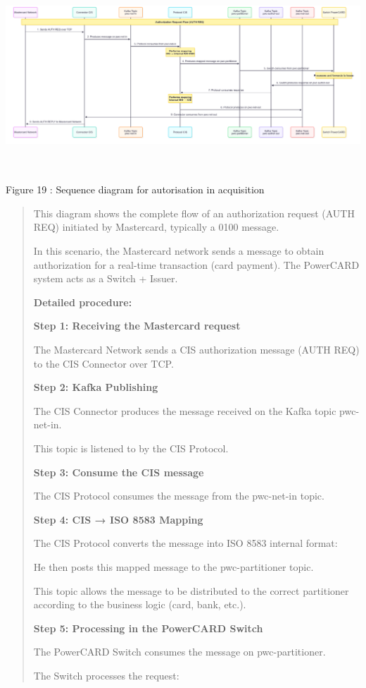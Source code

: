\documentclass[12pt,a4paper]{report}
\begin{document}
\includegraphics[width=7.21985in,height=2.8089in]{vertopal_d1b0b2209edd4c6aa8254f57daa0953b/media/image38.png}

\protect\hypertarget{_Toc201954495}{}{}Figure 19 : Sequence diagram for
autorisation in acquisition

\begin{quote}
This diagram shows the complete flow of an authorization request (AUTH
REQ) initiated by Mastercard, typically a 0100 message.

In this scenario, the Mastercard network sends a message to obtain
authorization for a real-time transaction (card payment). The PowerCARD
system acts as a Switch + Issuer.

\textbf{Detailed procedure:}

\textbf{Step 1: Receiving the Mastercard request}

The Mastercard Network sends a CIS authorization message (AUTH REQ) to
the CIS Connector over TCP.

\textbf{Step 2: Kafka Publishing}

The CIS Connector produces the message received on the Kafka topic
pwc-net-in.

This topic is listened to by the CIS Protocol.

\textbf{Step 3: Consume the CIS message}

The CIS Protocol consumes the message from the pwc-net-in topic.

\textbf{Step 4: CIS → ISO 8583 Mapping}

The CIS Protocol converts the message into ISO 8583 internal format:

He then posts this mapped message to the pwc-partitioner topic.

This topic allows the message to be distributed to the correct
partitioner according to the business logic (card, bank, etc.).

\textbf{Step 5: Processing in the PowerCARD Switch}

The PowerCARD Switch consumes the message on pwc-partitioner.

The Switch processes the request:
\end{quote}
\end{document}
